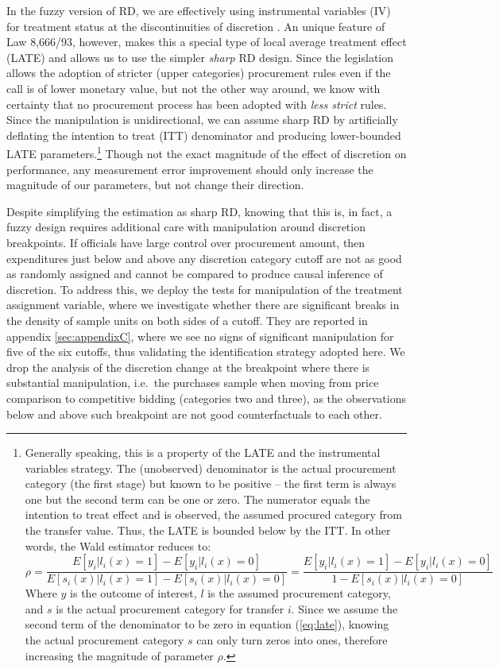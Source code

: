 \documentclass[11pt]{article}
\begin{document}
In the fuzzy version of RD, we are effectively using instrumental variables (IV) for treatment status at the discontinuities of discretion \citep{AngristMostlyharmlesseconometrics2008}. An unique feature of Law 8,666/93, however, makes this a special type of local average treatment effect (LATE) and allows us to use the simpler \emph{sharp} RD design. Since the legislation allows the adoption of stricter (upper categories) procurement rules even if the call is of lower monetary value, but not the other way around, we know with certainty that no procurement process has been adopted with \emph{less strict} rules. Since the manipulation is unidirectional, we can assume sharp RD by artificially deflating the intention to treat (ITT) denominator and producing lower-bounded LATE parameters.\footnote{Generally speaking, this is a property of the LATE and the instrumental variables strategy. The (unobserved) denominator is the actual procurement category (the first stage) but known to be positive -- the first term is always one but the second term can be one or zero. The numerator equals the intention to treat effect and is observed, the assumed procured category from the transfer value. Thus, the LATE is bounded below by the ITT. In other words, the Wald estimator reduces to:
\begin{equation} \label{eq:late}
  \rho = \frac{E[y_{i}|l_{i}(x)=1]-E[y_{i}|l_{i}(x)=0]}{E[s_{i}(x)|l_{i}(x)=1]-E[s_{i}(x)|l_{i}(x)=0]} = \frac{E[y_{i}|l_{i}(x)=1]-E[y_{i}|l_{i}(x)=0]}{1-E[s_{i}(x)|l_{i}(x)=0]}
\end{equation}
Where $y$ is the outcome of interest, $l$ is the assumed procurement category, and $s$ is the actual procurement category for transfer $i$. Since we assume the second term of the denominator to be zero in equation (\ref{eq:late}), knowing the actual procurement category $s$ can only turn zeros into ones, therefore increasing the magnitude of parameter $\rho$.} Though not the exact magnitude of the effect of discretion on performance, any measurement error improvement should only increase the magnitude of our parameters, but not change their direction.

Despite simplifying the estimation as sharp RD, knowing that this is, in fact, a fuzzy design requires additional care with manipulation around discretion breakpoints. If officials have large control over procurement amount, then expenditures just below and above any discretion category cutoff are not as good as randomly assigned and cannot be compared to produce causal inference of discretion. To address this, we deploy the \citet{McCraryManipulationRunningVariable2008} tests for manipulation of the treatment assignment variable, where we investigate whether there are significant breaks in the density of sample units on both sides of a cutoff. They are reported in appendix \ref{sec:appendixC}, where we see no signs of significant manipulation for five of the six cutoffs, thus validating the identification strategy adopted here. We drop the analysis of the discretion change at the breakpoint where there is substantial manipulation, i.e.~the purchases sample when moving from price comparison to competitive bidding (categories two and three), as the observations below and above such breakpoint are not good counterfactuals to each other.
\end{document}
